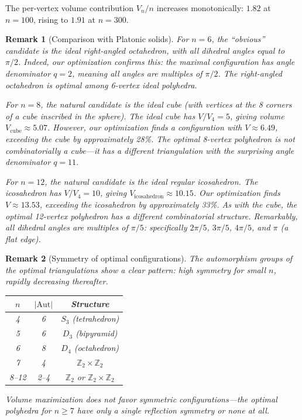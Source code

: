\documentclass[11pt]{article}
\newtheorem{remark}{Remark}
\begin{document}
The per-vertex volume contribution $V_n/n$ increases monotonically:
$1.82$ at $n = 100$, rising to $1.91$ at $n = 300$.

\begin{remark}[Comparison with Platonic solids]
For $n=6$, the ``obvious'' candidate is the ideal right-angled octahedron, with all dihedral angles equal to $\pi/2$. Indeed, our optimization confirms this: the maximal configuration has angle denominator $q=2$, meaning all angles are multiples of $\pi/2$. The right-angled octahedron is optimal among 6-vertex ideal polyhedra.

For $n=8$, the natural candidate is the ideal cube (with vertices at the 8 corners of a cube inscribed in the sphere). The ideal cube has $V/V_4 = 5$, giving volume $V_{\text{cube}} \approx 5.07$. However, our optimization finds a configuration with $V \approx 6.49$, exceeding the cube by approximately 28\%. The optimal 8-vertex polyhedron is \emph{not} combinatorially a cube---it has a different triangulation with the surprising angle denominator $q=11$.

For $n=12$, the natural candidate is the ideal regular icosahedron. The icosahedron has $V/V_4 = 10$, giving $V_{\text{icosahedron}} \approx 10.15$. Our optimization finds $V \approx 13.53$, exceeding the icosahedron by approximately 33\%. As with the cube, the optimal 12-vertex polyhedron has a different combinatorial structure. Remarkably, all dihedral angles are multiples of $\pi/5$: specifically $2\pi/5$, $3\pi/5$, $4\pi/5$, and $\pi$ (a flat edge).
\end{remark}

\begin{remark}[Symmetry of optimal configurations]
The automorphism groups of the optimal triangulations show a clear pattern: high symmetry for small $n$, rapidly decreasing thereafter.
\begin{center}
\begin{tabular}{ccc}
$n$ & $|\mathrm{Aut}|$ & Structure \\
\hline
4 & 6 & $S_3$ (tetrahedron) \\
5 & 6 & $D_3$ (bipyramid) \\
6 & 8 & $D_4$ (octahedron) \\
7 & 4 & $\mathbb{Z}_2 \times \mathbb{Z}_2$ \\
8--12 & 2--4 & $\mathbb{Z}_2$ or $\mathbb{Z}_2 \times \mathbb{Z}_2$
\end{tabular}
\end{center}
Volume maximization does not favor symmetric configurations---the optimal polyhedra for $n \geq 7$ have only a single reflection symmetry or none at all.
\end{remark}
\end{document}
